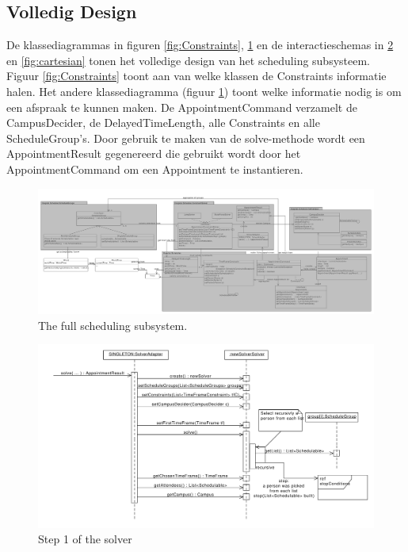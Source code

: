 \subsection{Volledig Design}
De klassediagrammas in figuren \ref{fig:Constraints}, \ref{fig:fullScheduling} en de interactieschemas in \ref{fig:solver} en \ref{fig:cartesian} tonen het volledige design van het scheduling subsysteem. 
Figuur \ref{fig:Constraints} toont aan van welke klassen de Constraints informatie halen. 
Het andere klassediagramma (figuur \ref{fig:fullScheduling}) toont welke informatie nodig is om een afspraak te kunnen maken. 
De AppointmentCommand verzamelt de CampusDecider, de DelayedTimeLength, alle Constraints en alle ScheduleGroup's. 
Door gebruik te maken van de solve-methode wordt een AppointmentResult gegenereerd die gebruikt wordt door het AppointmentCommand om een Appointment te instantieren. 
\\

\begin{figure}
\vspace{-2cm}
\centering
 \includegraphics[width=1.05\textheight, angle=270]{./exported/ScheduleGroup_End.pdf}
 \caption{The full scheduling subsystem.}
 \label{fig:fullScheduling}
\vspace{2cm}
\end{figure}

\begin{figure}
\hspace{-2cm}
 \includegraphics[width=1.2\textwidth]{./exported/interaction/Solver.pdf}
 \caption{Step 1 of the solver}
 \label{fig:solver}
\hspace{2cm}
\end{figure}

